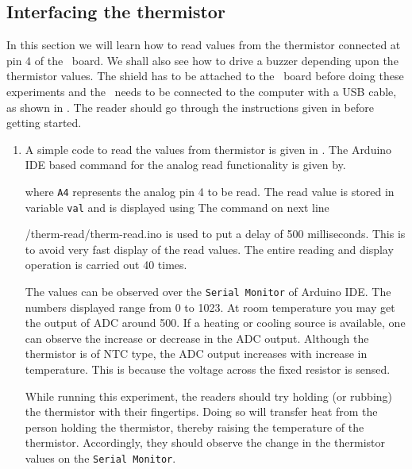 \subsection{Interfacing the thermistor}
In this section we will learn how to read values from the thermistor
connected at pin 4 of the \arduino\ board. We shall also see how to
drive a buzzer depending upon the thermistor values. The shield has to be attached to the \arduino\ board
before doing these experiments and the \arduino\ needs to be connected to the computer
with a USB cable, as shown in . The reader should go through the
instructions given in  before getting started.

\begin{enumerate}
  \item A simple code to read the values from thermistor is given in
        . The Arduino IDE based command for the analog read functionality is given by.
        
        where {\tt A4} represents the analog pin 4 to be read.
        The read value is stored in variable {\tt val} and is
        displayed using 
        The command on next line

          {\LocTHERMardcode/therm-read/therm-read.ino}
        is used to put a delay of 500 milliseconds. This is to avoid very fast display of the read values. The entire reading and display operation is carried out 40 times.

        The values can be observed over the {\tt Serial Monitor} of Arduino IDE.
        The numbers displayed range from 0 to 1023. At room temperature you may get the
        output of ADC around 500. If a heating or cooling source is available,
        one can observe the increase or decrease in the ADC output. Although
        the thermistor is of NTC type, the ADC output increases with increase
        in temperature. This is because the voltage across the fixed resistor
        is sensed.

        While running this experiment,
        the readers should try holding (or rubbing) the thermistor with their fingertips.
        Doing so will transfer heat from the person holding the
        thermistor, thereby raising the temperature of the thermistor. Accordingly, they should observe the change in the thermistor values
        on the {\tt Serial Monitor}.


\end{enumerate}
